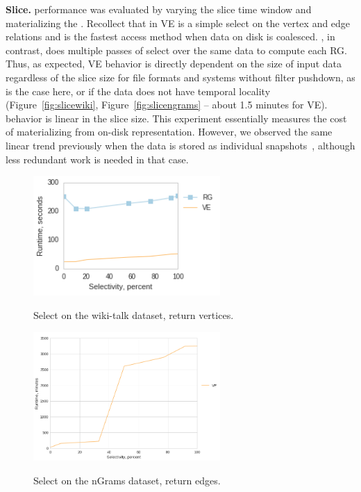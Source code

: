 {\bf Slice.}   performance was evaluated by varying the
slice time window and materializing the \tg.  Recollect that in VE
 is a simple select on the vertex and edge relations and
is the fastest access method when data on disk is coalesced.  \sg, in
contrast, does multiple passes of select over the same data to compute
each RG.  Thus, as expected, VE behavior is directly dependent on the
size of input data regardless of the slice size for file formats and
systems without filter pushdown, as is the case here, or if the data
does not have temporal locality (Figure~\ref{fig:slicewiki},
Figure~\ref{fig:slicengrams} -- about 1.5 minutes for VE).  \sg
behavior is linear in the slice size.  This experiment essentially
measures the cost of materializing \sg from \ve on-disk
representation.  However, we observed the same linear trend previously
when the data is stored as individual
snapshots~\cite{PortalarXiv2016}, although less redundant work is
needed in that case.

\begin{figure}
\centering
\begin{minipage}{3.3in}
\centering
\includegraphics[width=2.8in]{figs/select_wikitalk_vertices_build12.png}
\caption{Select on the wiki-talk dataset, return vertices.}
\vspace{-0.1in}
\label{fig:selectv}
\vspace{-0.1in}
\end{minipage}
\begin{minipage}{3.3in}
\centering
\includegraphics[width=2.8in]{figs/select_ngrams_edges_build12.png}
\vspace{-0.1in}
\caption{Select on the nGrams dataset, return edges.}
\vspace{-0.1in}
\label{fig:selecte}
\end{minipage}
\end{figure}

